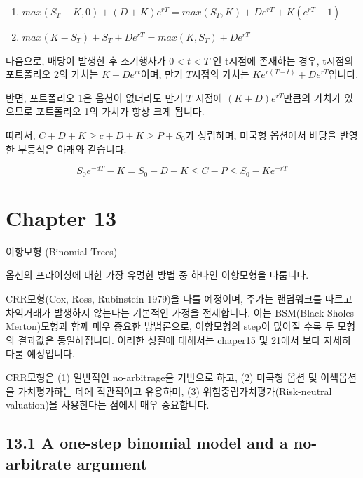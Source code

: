 \documentclass[
  letterpaper,
  DIV=11,
  numbers=noendperiod]{scrreprt}
\providecommand{\tightlist}{%
  \setlength{\itemsep}{0pt}\setlength{\parskip}{0pt}}\usepackage{longtable,booktabs,array}
\begin{document}
\begin{enumerate}
\def\labelenumi{\arabic{enumi}.}
\tightlist
\item
  \(max(S_T-K,0)+(D+K)e^{rT}=max(S_T,K)+De^{rT}+K(e^{rT}-1)\)
\item
  \(max(K-S_T)+S_T+De^{rT}=max(K,S_T)+De^{rT}\)
\end{enumerate}

다음으로, 배당이 발생한 후 조기행사가 \(0<t<T\) 인 t시점에 존재하는
경우, t시점의 포트폴리오 2의 가치는 \(K+De^{rt}\)이며, 만기 \(T\)시점의
가치는 \(Ke^{r(T-t)}+De^{rT}\)입니다.

반면, 포트폴리오 1은 옵션이 없더라도 만기 \(T\) 시점에
\((K+D)e^{rT}\)만큼의 가치가 있으므로 포트폴리오 1의 가치가 항상 크게
됩니다.

따라서, \(C+D+K\geq c+D+K\geq P+S_0\)가 성립하며, 미국형 옵션에서 배당을
반영한 부등식은 아래와 같습니다.

\[S_0e^{-dT}-K=S_0-D-K\leq C-P \leq S_0-Ke^{-rT}\]

\chapter*{Chapter 13}\label{chapter-13}


이항모형 (Binomial Trees)

옵션의 프라이싱에 대한 가장 유명한 방법 중 하나인 이항모형을 다룹니다.

CRR모형(Cox, Ross, Rubinstein 1979)을 다룰 예정이며, 주가는 랜덤워크를
따르고 차익거래가 발생하지 않는다는 기본적인 가정을 전제합니다. 이는
BSM(Black-Sholes-Merton)모형과 함께 매우 중요한 방법론으로, 이항모형의
step이 많아질 수록 두 모형의 결과값은 동일해집니다. 이러한 성질에
대해서는 chaper15 및 21에서 보다 자세히 다룰 예정입니다.

CRR모형은 (1) 일반적인 no-arbitrage을 기반으로 하고, (2) 미국형 옵션 및
이색옵션을 가치평가하는 데에 직관적이고 유용하며, (3)
위험중립가치평가(Risk-neutral valuation)을 사용한다는 점에서 매우
중요합니다.

\section*{13.1 A one-step binomial model and a no-arbitrate
argument}\label{a-one-step-binomial-model-and-a-no-arbitrate-argument}
\end{document}
